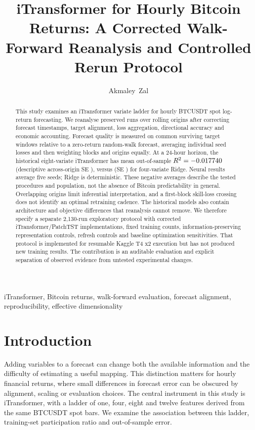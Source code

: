 \documentclass[onecolumn,journal,a4paper,11pt]{IEEEtran}
\title{iTransformer for Hourly Bitcoin Returns: A Corrected Walk-Forward
Reanalysis and Controlled Rerun Protocol}
\author{Akmaley~Zal}
\begin{document}
\maketitle

\begin{abstract}
This study examines an iTransformer variate ladder for hourly BTCUSDT spot
log-return forecasting. We reanalyse \StudyRuns{} preserved runs over
\StudyOrigins{} rolling origins after correcting forecast timestamps, target
alignment, loss aggregation, directional accuracy and economic accounting.
Forecast quality is measured on common surviving target windows relative to a
zero-return random-walk forecast, averaging individual seed losses and then
weighting blocks and origins equally. At a 24-hour horizon, the historical
eight-variate iTransformer has mean out-of-sample $R^2=-0.017740{}$
(descriptive across-origin SE \KEightSE{}), versus \RidgeRtwo{}
(SE \RidgeSE{}) for four-variate Ridge. Neural results average five seeds;
Ridge is deterministic. These negative averages describe the tested procedures
and population, not the absence of Bitcoin predictability in general.
Overlapping origins limit inferential interpretation, and a first-block
skill-loss crossing does not identify an optimal retraining cadence. The
historical models also contain architecture and objective differences that
reanalysis cannot remove. We therefore specify a separate 2,130-run exploratory
protocol with corrected iTransformer/PatchTST implementations, fixed training
counts, information-preserving representation controls, refresh controls and
baseline optimization sensitivities. That protocol is implemented for
resumable Kaggle T4 x2 execution but has not produced new training results.
The contribution is an auditable evaluation and explicit separation of
observed evidence from untested experimental changes.
\end{abstract}

\begin{IEEEkeywords}
iTransformer, Bitcoin returns, walk-forward evaluation, forecast alignment,
reproducibility, effective dimensionality
\end{IEEEkeywords}

\section{Introduction}
Adding variables to a forecast can change both the available information and
the difficulty of estimating a useful mapping. This distinction matters for
hourly financial returns, where small differences in forecast error can be
obscured by alignment, scaling or evaluation choices. The central instrument
in this study is iTransformer, with a ladder of one, four, eight and twelve
features derived from the same BTCUSDT spot bars. We examine the association
between this ladder, training-set participation ratio and out-of-sample error.
\end{document}
